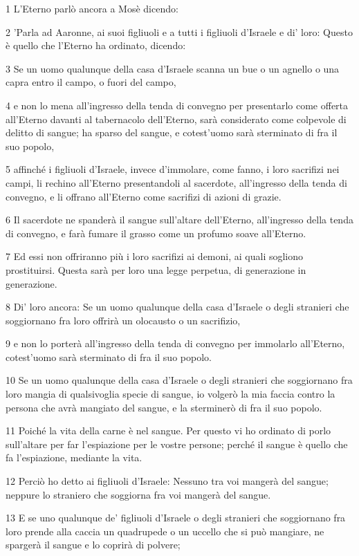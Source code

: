 \par 1 L'Eterno parlò ancora a Mosè dicendo:
\par 2 'Parla ad Aaronne, ai suoi figliuoli e a tutti i figliuoli d'Israele e di' loro: Questo è quello che l'Eterno ha ordinato, dicendo:
\par 3 Se un uomo qualunque della casa d'Israele scanna un bue o un agnello o una capra entro il campo, o fuori del campo,
\par 4 e non lo mena all'ingresso della tenda di convegno per presentarlo come offerta all'Eterno davanti al tabernacolo dell'Eterno, sarà considerato come colpevole di delitto di sangue; ha sparso del sangue, e cotest'uomo sarà sterminato di fra il suo popolo,
\par 5 affinché i figliuoli d'Israele, invece d'immolare, come fanno, i loro sacrifizi nei campi, li rechino all'Eterno presentandoli al sacerdote, all'ingresso della tenda di convegno, e li offrano all'Eterno come sacrifizi di azioni di grazie.
\par 6 Il sacerdote ne spanderà il sangue sull'altare dell'Eterno, all'ingresso della tenda di convegno, e farà fumare il grasso come un profumo soave all'Eterno.
\par 7 Ed essi non offriranno più i loro sacrifizi ai demoni, ai quali sogliono prostituirsi. Questa sarà per loro una legge perpetua, di generazione in generazione.
\par 8 Di' loro ancora: Se un uomo qualunque della casa d'Israele o degli stranieri che soggiornano fra loro offrirà un olocausto o un sacrifizio,
\par 9 e non lo porterà all'ingresso della tenda di convegno per immolarlo all'Eterno, cotest'uomo sarà sterminato di fra il suo popolo.
\par 10 Se un uomo qualunque della casa d'Israele o degli stranieri che soggiornano fra loro mangia di qualsivoglia specie di sangue, io volgerò la mia faccia contro la persona che avrà mangiato del sangue, e la sterminerò di fra il suo popolo.
\par 11 Poiché la vita della carne è nel sangue. Per questo vi ho ordinato di porlo sull'altare per far l'espiazione per le vostre persone; perché il sangue è quello che fa l'espiazione, mediante la vita.
\par 12 Perciò ho detto ai figliuoli d'Israele: Nessuno tra voi mangerà del sangue; neppure lo straniero che soggiorna fra voi mangerà del sangue.
\par 13 E se uno qualunque de' figliuoli d'Israele o degli stranieri che soggiornano fra loro prende alla caccia un quadrupede o un uccello che si può mangiare, ne spargerà il sangue e lo coprirà di polvere;
